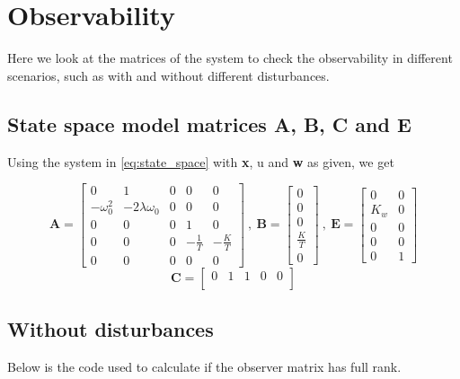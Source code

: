 
\section{Observability} \label{sec:part4}
Here we look at the matrices of the system to check the  observability in different scenarios, such as with and without different disturbances. 

\subsection{State space model matrices A, B, C and E}\label{sec:part4-1}
Using the system in \cref{eq:state_space} with \textbf{x}, u and \textbf{w} as given, we get

\begin{equation}
    \boldsymbol{A} = \begin{bmatrix}
        0 & 1 & 0 & 0 & 0 \\
        -\omega_0^2 & -2\lambda \omega_0 & 0 & 0 & 0 \\
        0 & 0 & 0 & 1 & 0 \\
        0 & 0 & 0 & -\frac{1}{T} & -\frac{K}{T} \\
        0 & 0 & 0 & 0 & 0 
    \end{bmatrix} \ , \ \boldsymbol{B} = \begin{bmatrix}
        0 \\ 0 \\ 0 \\ \frac{K}{T} \\ 0
    \end{bmatrix}\ , \ \boldsymbol{E} = \begin{bmatrix}
        0 & 0 \\
        K_w & 0 \\
        0 & 0 \\
        0 & 0 \\
        0 & 1 
    \end{bmatrix}
\end{equation}
\begin{equation}
    \boldsymbol{C} = \begin{bmatrix}
        0 & 1 & 1 & 0 & 0 \\
    \end{bmatrix}
\end{equation}

\subsection{Without disturbances}
Below is the code used to calculate if the observer matrix has full rank. 
\inputminted[linenos]{matlab}{Part4_pics/p4_til_rapport.m}

